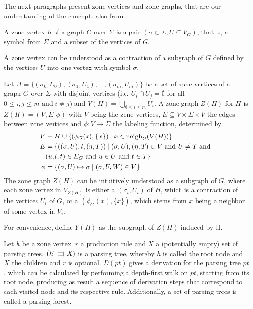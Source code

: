 The next paragraphs present zone vertices and zone graphs, that are our understanding of the concepts also from %

\begin{definition}
	\label{def:zv}
	A zone vertex $h$ of a graph $G$ over $\Sigma$ is a pair $(\sigma \in \Sigma, U \subseteq V_G)$, that is, a symbol from $\Sigma$ and a subset of the vertices of $G$.
	
	A zone vertex can be understood as a contraction of a subgraph of $G$ defined by the vertices $U$ into one vertex with symbol $\sigma$.
\end{definition}

\begin{definition}
	\label{def:z}
	Let $H = \{(\sigma_0,U_0),(\sigma_1,U_1),\dots,(\sigma_m,U_m)\}$ be a set of zone vertices of a graph $G$ over $\Sigma$ with disjoint vertices (i.e. $U_i \cap U_j = \emptyset$ for all $0 \leq i,j \leq m \text{ and } i \neq j$) and $V(H) = \bigcup_{0 \leq i \leq m}{U_i}$. A zone graph $Z(H)$ for $H$ is $Z(H) = (V, E, \phi)$ with $V$ being the zone vertices, $E \subseteq V \times \Sigma \times V$ the edges between zone vertices and $\phi: V \to \Sigma$ the labeling function, determined by
	\begin{align*}
		V & = H \cup \{(\phi_G(x),\{x\}) \; | \; x \in \operatorname{neigh}_{G}(V(H)) \}\\
		E & = \{((\sigma,U),l,(\eta,T)) \; | \; (\sigma,U),(\eta,T) \in V \text{ and } U \neq T \text{ and } \\
		& (u,l,t) \in E_G \text{ and } u \in U \text{ and } t \in T\} \\
		\phi & = \{(\sigma,U) \mapsto \sigma  \; | \; (\sigma,U,W) \in V\}
	\end{align*}
	The zone graph $Z(H)$ can be intuitively understood as a subgraph of $G$, where each zone vertex in $V_{Z(H)}$ is either a $(\sigma_i,U_i)$ of $H$, which is a contraction of the vertices $U_i$ of $G$, or a $(\phi_G(x),\{x\})$, which stems from $x$ being a neighbor of some vertex in $V_i$.
	
	For convenience, define $Y(H)$ as the subgraph of $Z(H)$ induced by H.
\end{definition}

\begin{definition}
	Let $h$ be a zone vertex, $r$ a production rule and $X$ a (potentially empty) set of parsing trees, $\ptree{h}{r}{X}$ is a parsing tree, whereby $h$ is called the root node and $X$ the children and $r$ is optional. $D(pt)$ gives a derivation for the parsing tree $pt$, which can be calculated by performing a depth-first walk on $pt$, starting from its root node, producing as result a sequence of derivation steps that correspond to each visited node and its respective rule. Additionally, a set of parsing trees is called a parsing forest.
\end{definition}

